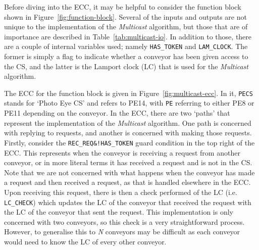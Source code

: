 \documentclass[12pt, conference]{IEEEtran}
\begin{document}
Before diving into the ECC, it may be helpful to consider the function block shown in
Figure~\ref{fig:function-block}. Several of the inputs and outputs are not unique to the
implementation of the \textit{Multicast} algorithm, but those that are of
importance are described in Table~\ref{tab:multicast-io}. In addition to
those, there are a couple of internal variables used; namely \texttt{HAS\_TOKEN}
and \texttt{LAM\_CLOCK}. The former is simply a flag to indicate whether
a conveyor has been given access to the CS, and the latter is the
Lamport clock (LC) that is used for the \textit{Multicast} algorithm. 

The ECC for the function block is
given in Figure~\ref{fig:multicast-ecc}. In it, \texttt{PECS} stands for `Photo Eye CS' and refers to PE14, with
\texttt{PE} referring to either PE8 or PE11 depending on the conveyor. 
In the ECC, there are two `paths' that represent the implementation of the \textit{Multicast} algorithm. One path is concerned with
replying to requests, and another is concerned with making those requests.
Firstly, consider the \texttt{REC\_REQ\&!HAS\_TOKEN} guard condition in the top
right of the ECC. This represents when the conveyor is receiving a request from
another conveyor, or in more literal terms it has received a request and is not
in the CS. Note that we are not concerned with what happens when
the conveyor has made a request and then received a request, as that is handled
elsewhere in the ECC. Upon receiving this request, there is then a check
performed of the LC (i.e. \texttt{LC\_CHECK}) which updates the
LC of the conveyor that received the request with the LC
of the conveyor that sent the request. This implementation is only concerned
with two conveyors, so this check is a very straightforward process. However,
to generalise this to \textit{N} conveyors may be difficult as each conveyor
would need to know the LC of every other conveyor.
\end{document}
